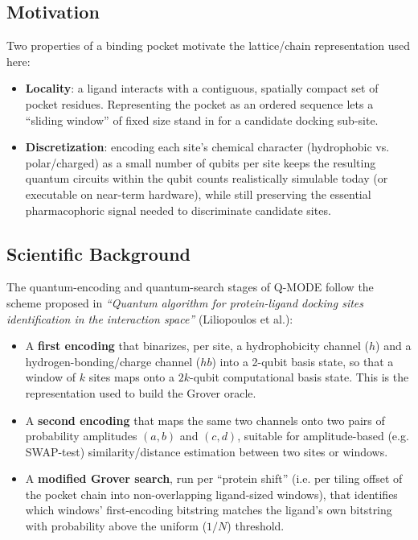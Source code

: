 \documentclass[11pt,a4paper]{article}
\begin{document}
\subsection{Motivation}

Two properties of a binding pocket motivate the lattice/chain representation used here:

\begin{itemize}[leftmargin=1.5em]
    \item \textbf{Locality}: a ligand interacts with a contiguous, spatially compact set of pocket residues. Representing the pocket as an ordered sequence lets a ``sliding window'' of fixed size stand in for a candidate docking sub-site.
    \item \textbf{Discretization}: encoding each site's chemical character (hydrophobic vs. polar/charged) as a small number of qubits per site keeps the resulting quantum circuits within the qubit counts realistically simulable today (or executable on near-term hardware), while still preserving the essential pharmacophoric signal needed to discriminate candidate sites.
\end{itemize}

\subsection{Scientific Background}

The quantum-encoding and quantum-search stages of Q-MODE follow the scheme proposed in \emph{``Quantum algorithm for protein-ligand docking sites identification in the interaction space''} (Liliopoulos et al.):

\begin{itemize}[leftmargin=1.5em]
    \item A \textbf{first encoding} that binarizes, per site, a hydrophobicity channel ($h$) and a hydrogen-bonding/charge channel ($hb$) into a 2-qubit basis state, so that a window of $k$ sites maps onto a $2k$-qubit computational basis state. This is the representation used to build the Grover oracle.
    \item A \textbf{second encoding} that maps the same two channels onto two pairs of probability amplitudes $(a,b)$ and $(c,d)$, suitable for amplitude-based (e.g. SWAP-test) similarity/distance estimation between two sites or windows.
    \item A \textbf{modified Grover search}, run per ``protein shift'' (i.e. per tiling offset of the pocket chain into non-overlapping ligand-sized windows), that identifies which windows' first-encoding bitstring matches the ligand's own bitstring with probability above the uniform ($1/N$) threshold.
\end{itemize}
\end{document}
